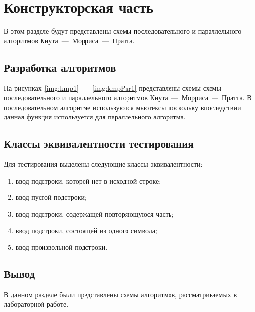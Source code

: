 \chapter{Конструкторская часть}

В этом разделе будут представлены схемы последовательного и параллельного алгоритмов Кнута~---~Морриса~---~Пратта.

\section{Разработка алгоритмов}

На рисунках~\ref{img:kmp1}~---~\ref{img:kmpPar1} представлены схемы схемы последовательного и параллельного алгоритмов Кнута~---~Морриса~---~Пратта. В последовательном алгоритме используются мьютексы поскольку впоследствии данная функция используется для параллельного алгоритма.




\newpage
\section{Классы эквивалентности тестирования}

Для тестирования выделены следующие классы эквивалентности:
\begin{enumerate}
	\item ввод подстроки, которой нет в исходной строке;
	\item ввод пустой подстроки;
	\item ввод подстроки, содержащей повторяющуюся часть;
	\item ввод подстроки, состоящей из одного символа;
	\item ввод произвольной подстроки.
\end{enumerate}

\section{Вывод}

В данном разделе были представлены схемы алгоритмов, рассматриваемых в лабораторной работе.